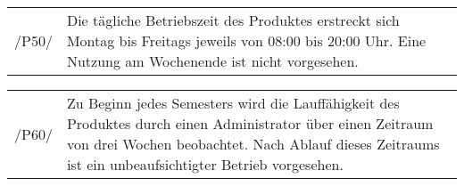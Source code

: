 \begin{tabular}{p{1.5cm}p{14.5cm}}	
	 /P50/& Die tägliche Betriebszeit des Produktes erstreckt sich Montag bis Freitags jeweils von 08:00 bis 20:00 Uhr. Eine Nutzung am Wochenende ist nicht vorgesehen. \\[0.25cm]
\end{tabular}

\begin{tabular}{p{1.5cm}p{14.5cm}}	
	 /P60/& Zu Beginn jedes Semesters wird die Lauffähigkeit des Produktes durch einen Administrator über einen Zeitraum von drei Wochen beobachtet. Nach Ablauf dieses Zeitraums ist ein unbeaufsichtigter Betrieb vorgesehen. \\[0.25cm]
\end{tabular}
